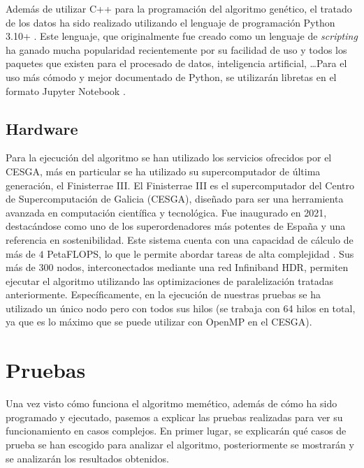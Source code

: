 Además de utilizar C++ para la programación del algoritmo genético, el tratado de los datos ha sido realizado utilizando el lenguaje de programación Python 3.10+ \cite{Python}. Este lenguaje, que originalmente fue creado como un lenguaje de \textit{scripting} ha ganado mucha popularidad recientemente por su facilidad de uso y todos los paquetes que existen para el procesado de datos, inteligencia artificial, \ldots Para el uso más cómodo y mejor documentado de Python, se utilizarán libretas en el formato Jupyter Notebook \cite{jupyter}.
\subsection{Hardware}
Para la ejecución del algoritmo se han utilizado los servicios ofrecidos por el CESGA, más en particular se ha utilizado su supercomputador de última generación, el Finisterrae III. El Finisterrae III es el supercomputador del Centro de Supercomputación de Galicia (CESGA), diseñado para ser una herramienta avanzada en computación científica y tecnológica. Fue inaugurado en 2021, destacándose como uno de los superordenadores más potentes de España y una referencia en sostenibilidad. Este sistema cuenta con una capacidad de cálculo de más de $4$ PetaFLOPS, lo que le permite abordar tareas de alta complejidad \cite{finisterrae}. Sus más de 300 nodos, interconectados mediante una red Infiniband HDR, permiten ejecutar el algoritmo utilizando las optimizaciones de paralelización tratadas anteriormente. Específicamente, en la ejecución de nuestras pruebas se ha utilizado un único nodo pero con todos sus hilos (se trabaja con 64 hilos en total, ya que es lo máximo que se puede utilizar con OpenMP en el CESGA).

\section{Pruebas}
Una vez visto cómo funciona el algoritmo memético, además de cómo ha sido programado y ejecutado, pasemos a explicar las pruebas realizadas para ver su funcionamiento en casos complejos. En primer lugar, se explicarán qué casos de prueba se han escogido para analizar el algoritmo, posteriormente se mostrarán y se analizarán los resultados obtenidos.
